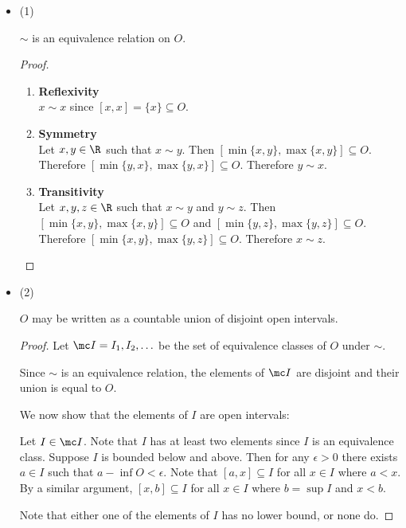 \begin{itemize}
\item (1)
  \begin{claim*}
    $\sim$ is an equivalence relation on $O$.
  \end{claim*}
  \begin{proof}
    \begin{enumerate}
    \item {\bf Reflexivity}\\
      $x \sim x$ since $[x, x] = \{x\} \subseteq O$.

    \item {\bf Symmetry}\\
      Let $x, y \in \R$ such that $x \sim y$. Then $[\min\{x, y\}, \max\{x, y\}] \subseteq O$.
      Therefore $[\min\{y, x\}, \max\{y, x\}] \subseteq O$. Therefore $y \sim x$.

    \item {\bf Transitivity}\\
      Let $x, y, z \in \R$ such that $x \sim y$ and $y \sim z$. Then $[\min\{x, y\}, \max\{x, y\}] \subseteq O$
      and $[\min\{y, z\}, \max\{y, z\}] \subseteq O$. Therefore $[\min\{x, y\}, \max\{y, z\}] \subseteq O$.
      Therefore $x \sim z$.
    \end{enumerate}
  \end{proof}

\item (2)
  \begin{claim*}
    $O$ may be written as a countable union of disjoint open intervals.
  \end{claim*}

  \begin{proof}
    Let $\mc I = I_1, I_2, \ldots$ be the set of equivalence classes of $O$ under $\sim$.

    Since $\sim$ is an equivalence relation, the elements of $\mc I$ are disjoint and their union is equal
    to $O$.

    We now show that the elements of $I$ are open intervals:

    Let $I \in \mc I$. Note that $I$ has at least two elements since $I$ is an equivalence class. Suppose $I$
    is bounded below and above. Then for any $\epsilon > 0$ there exists $a \in I$ such
    that $a - \inf O < \epsilon$. Note that $[a, x] \subseteq I$ for all $x \in I$ where $a < x$. By a similar
    argument, $[x, b] \subseteq I$ for all $x \in I$ where $b = \sup I$ and $x < b$.

    Note that either one of the elements of $I$ has no lower bound, or none do.


\end{proof}
\end{itemize}
